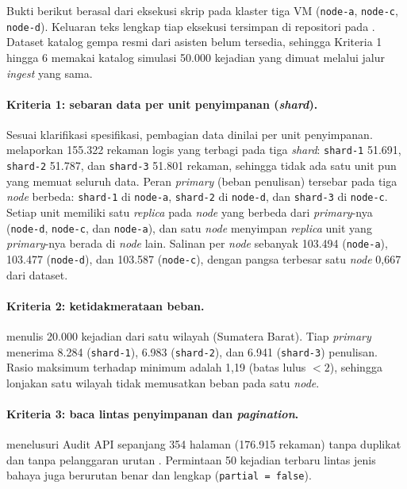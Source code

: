 Bukti berikut berasal dari eksekusi skrip pada klaster tiga VM (\texttt{node-a}, \texttt{node-c}, \texttt{node-d}). Keluaran teks lengkap tiap eksekusi tersimpan di repositori pada . Dataset katalog gempa resmi dari asisten belum tersedia, sehingga Kriteria 1 hingga 6 memakai katalog simulasi 50.000 kejadian yang dimuat melalui jalur \textit{ingest} yang sama.


\paragraph*{Kriteria 1: sebaran data per unit penyimpanan (\textit{shard}).}
Sesuai klarifikasi spesifikasi, pembagian data dinilai per unit penyimpanan.  melaporkan 155.322 rekaman logis yang terbagi pada tiga \textit{shard}: \texttt{shard-1} 51.691, \texttt{shard-2} 51.787, dan \texttt{shard-3} 51.801 rekaman, sehingga tidak ada satu unit pun yang memuat seluruh data. Peran \textit{primary} (beban penulisan) tersebar pada tiga \textit{node} berbeda: \texttt{shard-1} di \texttt{node-a}, \texttt{shard-2} di \texttt{node-d}, dan \texttt{shard-3} di \texttt{node-c}. Setiap unit memiliki satu \textit{replica} pada \textit{node} yang berbeda dari \textit{primary}-nya (\texttt{node-d}, \texttt{node-c}, dan \texttt{node-a}), dan satu \textit{node} menyimpan \textit{replica} unit yang \textit{primary}-nya berada di \textit{node} lain. Salinan per \textit{node} sebanyak 103.494 (\texttt{node-a}), 103.477 (\texttt{node-d}), dan 103.587 (\texttt{node-c}), dengan pangsa terbesar satu \textit{node} 0,667 dari dataset.

\paragraph*{Kriteria 2: ketidakmerataan beban.}
 menulis 20.000 kejadian dari satu wilayah (Sumatera Barat). Tiap \textit{primary} menerima 8.284 (\texttt{shard-1}), 6.983 (\texttt{shard-2}), dan 6.941 (\texttt{shard-3}) penulisan. Rasio maksimum terhadap minimum adalah 1,19 (batas lulus $< 2$), sehingga lonjakan satu wilayah tidak memusatkan beban pada satu \textit{node}.

\paragraph*{Kriteria 3: baca lintas penyimpanan dan \textit{pagination}.}
 menelusuri Audit API sepanjang 354 halaman (176.915 rekaman) tanpa duplikat dan tanpa pelanggaran urutan . Permintaan 50 kejadian terbaru lintas jenis bahaya juga berurutan benar dan lengkap (\texttt{partial = false}).

